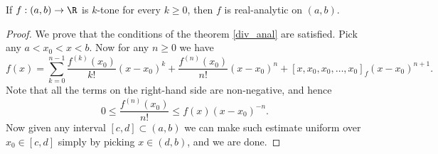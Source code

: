 \begin{lause}
	If $f : (a, b) \to \R$ is $k$-tone for every $k \geq 0$, then $f$ is real-analytic on $(a, b)$.
\end{lause}
\begin{proof}
	We prove that the conditions of the theorem \ref{div_anal} are satisfied. Pick any $a < x_{0} < x < b$. Now for any $n \geq 0$ we have
	\[
		f(x) = \sum_{k = 0}^{n - 1} \frac{f^{(k)}(x_{0})}{k!}(x - x_{0})^{k} + \frac{f^{(n)}(x_{0})}{n!} (x - x_{0})^{n} + [x, x_{0}, x_{0}, \ldots, x_{0}]_{f} (x - x_{0})^{n + 1}.
	\]
	Note that all the terms on the right-hand side are non-negative, and hence
	\[
		0 \leq \frac{f^{(n)}(x_{0})}{n!} \leq f(x) (x - x_{0})^{-n}.
	\]
	Now given any interval $[c, d] \subset (a, b)$ we can make such estimate uniform over $x_{0} \in [c, d]$ simply by picking $x \in (d, b)$, and we are done.
\end{proof}


